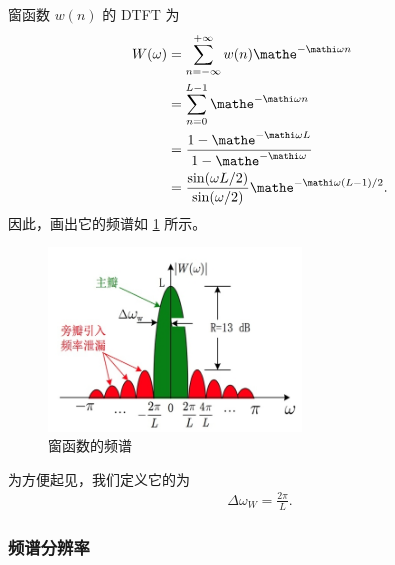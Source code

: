 \begin{example}[窗函数的频谱与主瓣宽度]
    窗函数 $w(n)$ 的 DTFT 为
    \begin{align*}
        W(\omega) & = \sum_{n = -\infty}^{+\infty}w(n) \mathe^{-\mathi\omega n} \\
        & = \sum_{n = 0}^{L-1}\mathe^{-\mathi\omega n} \\
        & = \frac{1 - \mathe^{-\mathi\omega L}}{1 - \mathe^{-\mathi\omega}} \\
        & = \frac{\sin(\omega L/2)}{\sin(\omega/2)}\mathe^{-\mathi\omega(L-1)/2}.
    \end{align*}
    因此，画出它的频谱如 \ref{fig:DTFT_window.png} 所示。
    \begin{figure}[H]
        \centering
        \includegraphics[width=0.6\textwidth]{chap3/img/DTFT_window.png}
        \caption{窗函数的频谱}
        \label{fig:DTFT_window.png}
    \end{figure}
    为方便起见，我们定义它的为
    \begin{align*}
        \Delta\omega_W = \frac{2\pi}{L}.
    \end{align*}
\end{example}

\subsubsection{频谱分辨率}

